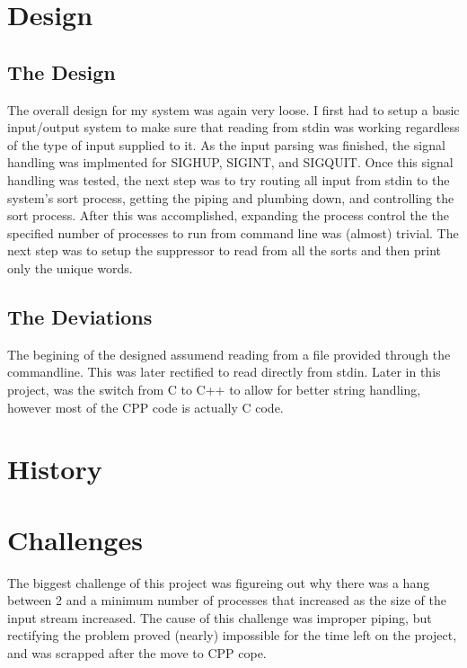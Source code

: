 \documentclass[letterpaper,10pt,titlepage]{article}
\begin{document}
\section{Design}
\label{System Design & Deviations}

\subsection{The Design}
\label{DesingProcess}
The overall design for my system was again very loose. I first had to setup a basic input/output system to make sure that reading from stdin was working regardless of the type of input supplied to it.
As the input parsing was finished, the signal handling was implmented for SIGHUP, SIGINT, and SIGQUIT. Once this signal handling was tested, the next step was to try routing all input from stdin to the system's sort process, getting the piping and plumbing down, and controlling the sort process.
After this was accomplished, expanding the process control the the specified number of processes to run from command line was (almost) trivial.
The next step was to setup the suppressor to read from all the sorts and then print only the unique words.
\subsection{The Deviations}
\label{Deviations}
The begining of the designed assumend reading from a file provided through the commandline. This was later rectified to read directly from stdin.
Later in this project, was the switch from C to C++ to allow for better string handling, however most of the CPP code is actually C code.
\section{History}
\label{myar Revision History}
%

\section{Challenges}
\label{Overcoming Project challenges}
The biggest challenge of this project was figureing out why there was a hang between 2 and a minimum number of processes that increased as the size of the input stream increased. The cause of this challenge was improper piping, but rectifying the problem proved (nearly) impossible for the time left on the project, and was scrapped after the move to CPP cope.
\end{document}
